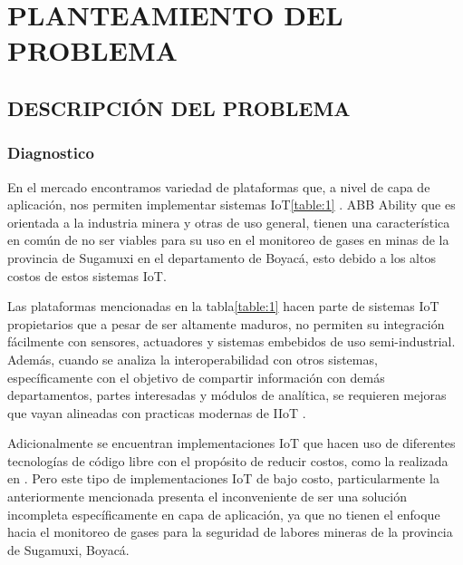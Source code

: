 \documentclass[stu,12pt,floatsintext]{apa7}
\begin{document}
	\section{PLANTEAMIENTO DEL PROBLEMA}
	\subsection{DESCRIPCIÓN DEL PROBLEMA}

	\subsubsection{Diagnostico}
	
	 En el mercado encontramos variedad de plataformas que, a nivel de capa de aplicación, nos permiten implementar sistemas IoT\ref{table:1} . ABB Ability que es orientada a la industria minera\cite{iot-platforms} y otras de uso general, tienen una característica en común de no ser viables para su uso en el monitoreo de gases en minas de la provincia de Sugamuxi en el departamento de Boyacá, esto debido a los altos costos de estos sistemas IoT. 
	 
	Las plataformas mencionadas en la tabla\ref{table:1} hacen parte de sistemas IoT propietarios que a pesar de ser altamente maduros, no permiten su integración fácilmente con sensores, actuadores y sistemas embebidos de uso semi-industrial. Además, cuando se analiza la interoperabilidad con otros sistemas, específicamente con el objetivo de compartir información con demás departamentos, partes interesadas y módulos de analítica, se requieren mejoras que vayan alineadas con practicas modernas de IIoT \cite{iot1020029}.
	
	Adicionalmente se encuentran implementaciones IoT  que hacen uso de diferentes tecnologías de código libre con el propósito de reducir costos, como la realizada en  \cite{electronics8080822}. Pero este tipo de implementaciones IoT  de bajo costo, particularmente la anteriormente mencionada presenta el inconveniente de ser una solución incompleta específicamente en capa de aplicación, ya que no tienen el enfoque hacia el monitoreo de gases para la seguridad de labores mineras de la provincia de Sugamuxi, Boyacá.
	 
\end{document}
